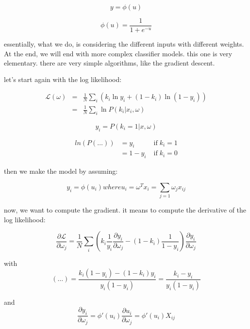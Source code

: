 \documentclass[a4paper]{tufte-book}
\begin{document}
\begin{equation}
    y = \phi (u)
\end{equation}

\begin{equation}
    \phi (u) = \frac{1}{1+e^{-u}}
\end{equation}

essentially, what we do, is considering the different inputs with different
weights.
At the end, we will end with more complex classifier models. this one is very
elementary.
there are very simple algorithms, like the gradient descent.


let's start again with the log likelihood:

\begin{eqnarray}
    \mathcal{L}(\omega) & = & \frac{1}{N} \sum_i (k_i \ln y_i + (1-k_i) \ln(1-y_i))\\
    & = & \frac{1}{N} \sum_i \ln P (k_i | x_i,\omega)
\end{eqnarray}

\begin{equation}
    y_i = P(k_i =1 |x,\omega)
\end{equation}

\begin{eqnarray}
    ln(P(\ldots)) & = y_i & \;\text{if}\; k_i = 1 \\
    & = 1-y_i & \;\text{if}\; k_i = 0
\end{eqnarray}

then we make the model by assuming:

\begin{equation}
    y_i = \phi (u_i) where u_i = \omega^T x_i = \sum_{j=1} \omega_j x_{ij}
\end{equation}

now, we want to compute the gradient.
it means to compute the derivative of the log likelihood:

\begin{equation}
    \frac{\partial \mathcal{L}}{\partial \omega_j} = \frac{1}{N} \sum_i (k_i \frac{1}{y_i} \frac{\partial y_i}{\partial\omega_j} - (1-k_i)
\frac{1}{1-y_i}) \frac{\partial y_i}{\partial \omega_j}
\end{equation}

with
\begin{equation}
    (\ldots) = \frac{ k_i (1-y_i) - (1-k_i)y_i}{y_i (1-y_i)} = \frac{k_i - y_i}{y_i (1-y_i)} 
\end{equation}


and \begin{equation}
    \frac{\partial y_i}{\partial \omega_j} = \phi'(u_i) \frac{\partial u_i}{\partial \omega_j} = \phi'(u_i) X_{ij}
\end{equation}
\end{document}
